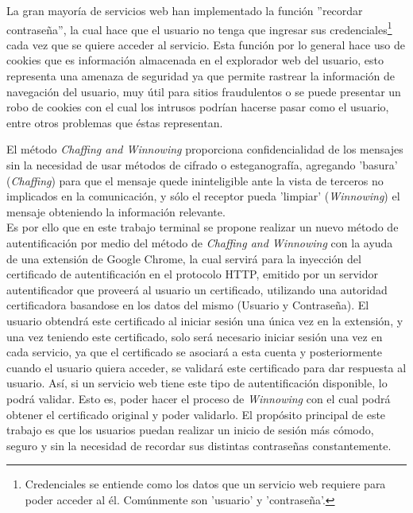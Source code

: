 \documentclass[12pt, a4paper, titlepage]{report}
\begin{document}
		La gran mayoría de servicios web han implementado la función ''recordar contraseña'', la cual hace que el usuario no tenga que ingresar sus credenciales\footnote{Credenciales se entiende como los datos que un servicio web requiere para poder acceder al él. Comúnmente son 'usuario' y 'contraseña'.} cada vez que se quiere acceder al servicio. Esta función por lo general hace uso de cookies que es información almacenada en el explorador web del usuario, esto representa una amenaza de seguridad ya que permite rastrear la información de navegación del usuario, muy útil para sitios fraudulentos o se puede presentar un robo de cookies con el cual los intrusos podrían hacerse pasar como el usuario, entre otros problemas que \'estas representan.
	    
	    
	    El método \textit{Chaffing and Winnowing} proporciona confidencialidad de los mensajes sin la necesidad de usar métodos de cifrado o esteganografía, agregando 'basura' (\textit{Chaffing}) para que el mensaje quede ininteligible ante la vista de terceros no implicados en la comunicación, y sólo el receptor pueda 'limpiar' (\textit{Winnowing}) el mensaje obteniendo la información relevante.\\
	    
		Es por ello que en este trabajo terminal se propone realizar un nuevo método de autentificación por medio del método de \textit{Chaffing and Winnowing} con la ayuda de una extensión de Google Chrome, la cual servirá para la inyección del certificado de autentificación en el protocolo HTTP, emitido por un servidor autentificador que proveerá al usuario un certificado, utilizando una autoridad certificadora basandose en los datos del mismo (Usuario y Contraseña). El usuario obtendrá este certificado al iniciar sesión una única vez en la extensión, y una vez teniendo este certificado, solo será necesario iniciar sesión una  vez en cada servicio, ya que el certificado se asociará a esta cuenta y posteriormente cuando el usuario quiera acceder, se validará este certificado para dar respuesta al usuario. Así, si un servicio web tiene este tipo de autentificación disponible, lo podrá validar. Esto es, poder hacer el proceso de \textit{Winnowing} con el cual podrá obtener el certificado original y poder validarlo. El propósito principal de este trabajo es que los usuarios puedan realizar un inicio de sesión más cómodo, seguro y sin la necesidad de recordar sus distintas contraseñas constantemente.
		
\end{document}
